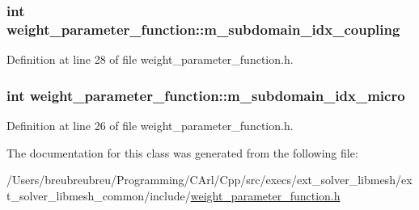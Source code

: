\subsubsection[{m\+\_\+subdomain\+\_\+idx\+\_\+coupling}]{\setlength{\rightskip}{0pt plus 5cm}int weight\+\_\+parameter\+\_\+function\+::m\+\_\+subdomain\+\_\+idx\+\_\+coupling\hspace{0.3cm}{\ttfamily [protected]}}\label{classweight__parameter__function_a516c68be83fc9cdc80c8bf4aecf395a4}


Definition at line 28 of file weight\+\_\+parameter\+\_\+function.\+h.

\hypertarget{classweight__parameter__function_a21eb1aebdae4706322cb17982c931eef}{}
\subsubsection[{m\+\_\+subdomain\+\_\+idx\+\_\+micro}]{\setlength{\rightskip}{0pt plus 5cm}int weight\+\_\+parameter\+\_\+function\+::m\+\_\+subdomain\+\_\+idx\+\_\+micro\hspace{0.3cm}{\ttfamily [protected]}}\label{classweight__parameter__function_a21eb1aebdae4706322cb17982c931eef}


Definition at line 26 of file weight\+\_\+parameter\+\_\+function.\+h.



The documentation for this class was generated from the following file\+:\begin{DoxyCompactItemize}
\item 
/\+Users/breubreubreu/\+Programming/\+C\+Arl/\+Cpp/src/execs/ext\+\_\+solver\+\_\+libmesh/ext\+\_\+solver\+\_\+libmesh\+\_\+common/include/\hyperlink{execs_2ext__solver__libmesh_2ext__solver__libmesh__common_2include_2weight__parameter__function_8h}{weight\+\_\+parameter\+\_\+function.\+h}\end{DoxyCompactItemize}
